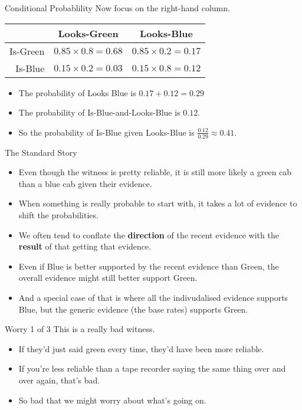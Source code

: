 \documentclass[
  ignorenonframetext,
]{beamer}
\providecommand{\tightlist}{%
  \setlength{\itemsep}{0pt}\setlength{\parskip}{0pt}}
\renewcommand{\,}{\text{, }}
\begin{document}
\begin{frame}{Conditional Probablility}
\protect\hypertarget{conditional-probablility}{}
Now focus on the right-hand column.

\begin{longtable}[]{@{}rcc@{}}
\toprule
& Looks-Green & Looks-Blue \\
\midrule
\endhead
Is-Green & \(0.85 \times 0.8 = 0.68\) & \(0.85 \times 0.2 = 0.17\) \\
Is-Blue & \(0.15 \times 0.2 = 0.03\) & \(0.15 \times 0.8 = 0.12\) \\
\bottomrule
\end{longtable}

\pause

\begin{itemize}
\tightlist
\item
  The probability of Looks Blue is \(0.17 + 0.12 = 0.29\) \pause
\item
  The probability of Is-Blue-and-Looks-Blue is \(0.12\). \pause
\item
  So the probability of Is-Blue given Looks-Blue is
  \(\frac{0.12}{0.29} \approx 0.41\).
\end{itemize}
\end{frame}

\begin{frame}{The Standard Story}
\protect\hypertarget{the-standard-story}{}
\begin{itemize}[<+->]
\tightlist
\item
  Even though the witness is pretty reliable, it is still more likely a
  green cab than a blue cab given their evidence.
\item
  When something is really probable to start with, it takes a lot of
  evidence to shift the probabilities.
\item
  We often tend to conflate the \textbf{direction} of the recent
  evidence with the \textbf{result} of that getting that evidence.
\item
  Even if Blue is better supported by the recent evidence than Green,
  the overall evidence might still better support Green.
\item
  And a special case of that is where all the indivudalised evidence
  supports Blue, but the generic evidence (the base rates) supports
  Green.
\end{itemize}
\end{frame}

\begin{frame}{Worry 1 of 3}
\protect\hypertarget{worry-1-of-3}{}
This is a really bad witness.

\begin{itemize}
\tightlist
\item
  If they'd just said green every time, they'd have been more reliable.
\item
  If you're less reliable than a tape recorder saying the same thing
  over and over again, that's bad.
\item
  So bad that we might worry about what's going on.
\end{itemize}
\end{frame}
\end{document}
